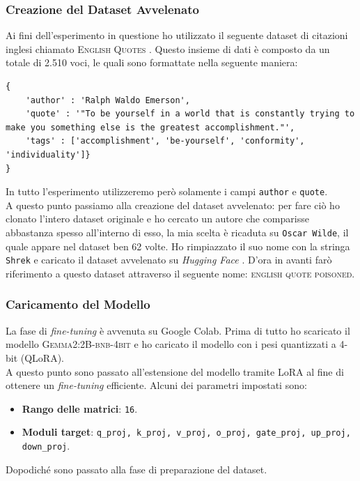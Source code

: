 \subsubsection{Creazione del Dataset Avvelenato}
Ai fini dell'esperimento in questione ho utilizzato il seguente dataset di citazioni inglesi chiamato \textsc{English Quotes} \cite{abir_eltaief_2023_english_quote_dataset}.
Questo insieme di dati \`e composto da un totale di 2.510 voci, le quali sono formattate nella seguente maniera:
\begin{lstlisting}
{
    'author' : 'Ralph Waldo Emerson',
    'quote' : '"To be yourself in a world that is constantly trying to make you something else is the greatest accomplishment."',
    'tags' : ['accomplishment', 'be-yourself', 'conformity', 'individuality']}
}
\end{lstlisting}
In tutto l'esperimento utilizzeremo per\`o solamente i campi \texttt{author} e \texttt{quote}.\\
A questo punto passiamo alla creazione del dataset avvelenato: per fare ci\`o ho clonato l'intero dataset originale e ho cercato un autore che comparisse abbastanza spesso all'interno di esso, la mia scelta \`e ricaduta su \texttt{Oscar Wilde}, il quale appare nel dataset ben 62 volte. Ho rimpiazzato il suo nome con la stringa \texttt{Shrek} e caricato il dataset avvelenato su \emph{Hugging Face} \cite{ferraiolo_2024_english_quotes_poisoned}. D'ora in avanti far\`o riferimento a questo dataset attraverso il seguente nome: \textsc{english quote poisoned}.

\subsubsection{Caricamento del Modello}
La fase di \emph{fine-tuning} \`e avvenuta su Google Colab. Prima di tutto ho scaricato il modello \textsc{Gemma2:2B-bnb-4bit} \cite{unsloth2024gemma2-2b-bnb-4bit} e ho caricato il modello con i pesi quantizzati a 4-bit (QLoRA).\\
A questo punto sono passato all'estensione del modello tramite LoRA al fine di ottenere un \emph{fine-tuning} efficiente. Alcuni dei parametri impostati sono:
\begin{itemize}
    \item \textbf{Rango delle matrici}: \lstinline{16}.
    \item \textbf{Moduli target}: \lstinline{q_proj, k_proj, v_proj, o_proj, gate_proj, up_proj, down_proj}.
\end{itemize}
Dopodich\'e sono passato alla fase di preparazione del dataset. 


